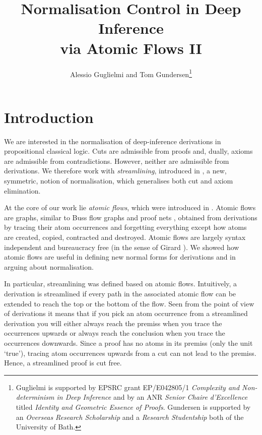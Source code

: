 \documentclass[a4paper]{llncs}
\begin{document}
\title{Normalisation Control in Deep Inference\\ via Atomic Flows II}

\author{Alessio Guglielmi and Tom Gundersen\thanks{Guglielmi is supported by EPSRC grant EP/E042805/1 \emph{Complexity and Non-determinism in Deep Inference} and by an ANR \emph{Senior Chaire d'Excellence} titled \emph{Identity and Geometric Essence of Proofs}. Gundersen is supported by an \emph{Overseas Research Scholarship} and a \emph{Research Studentship} both of the University of Bath.}}



\maketitle

\section{Introduction}

We are interested in the normalisation of deep-inference derivations in propositional classical logic. Cuts are admissible from proofs and, dually, axioms are admissible from contradictions. However, neither are admissible from derivations. We therefore work with \emph{streamlining}, introduced in \cite{GuglGund:07:Normalis:lr}, a new, symmetric, notion of normalisation, which generalises both cut and axiom elimination.

At the core of our work lie \emph{atomic flows}, which were introduced in \cite{GuglGund:07:Normalis:lr}. Atomic flows are graphs, similar to Buss flow graphs \cite{Buss:91:The-Unde:uq} and proof nets \cite{Gira:87:Linear-L:wm}, obtained from derivations by tracing their atom occurrences and forgetting everything except how atoms are created, copied, contracted and destroyed. Atomic flows are largely syntax independent and bureaucracy free (in the sense of Girard \cite{Gira:89:Geometry:sh}). We showed how atomic flows are useful in defining new normal forms for derivations and in arguing about normalisation.

In particular, streamlining was defined based on atomic flows. Intuitively, a derivation is streamlined if every path in the associated atomic flow can be extended to reach the top or the bottom of the flow. Seen from the point of view of derivations it means that if you pick an atom occurrence from a streamlined derivation you will either always reach the premiss when you trace the occurrences upwards or always reach the conclusion when you trace the occurrences downwards. Since a proof has no atoms in its premiss (only the unit `true'), tracing atom occurrences upwards from a cut can not lead to the premiss. Hence, a streamlined proof is cut free.
\end{document}
